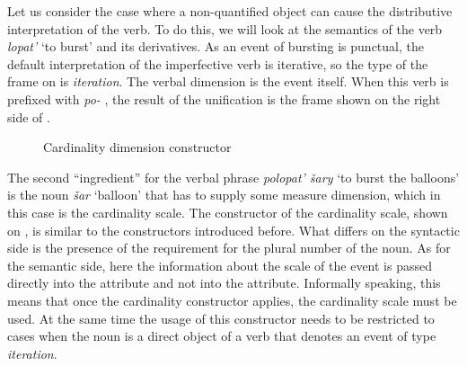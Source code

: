 Let us consider the case where a non-quantified object can cause the distributive  interpretation of the verb. To do this, we will look at the semantics of the verb \textit{lopat'} `to burst' and its derivatives. As an event of bursting is punctual, the default interpretation of the imperfective verb  is iterative, so the type of the frame on  is \textit{iteration}. The verbal dimension is the event itself. When this verb is prefixed with \textit{po-}  , the result of the unification is the frame shown on the right side of .

\begin{figure}
\small
{}
\hspace{1em}\normalsize%
\caption{Cardinality dimension constructor\label{constructor:cardinality}}
\end{figure}

The second ``ingredient'' for the verbal phrase \textit{polopat' \v{s}ary} `to burst the balloons' is the noun \textit{\v{s}ar} `balloon' that has to supply some measure dimension, which in this case is the cardinality scale. The constructor of the cardinality scale, shown on , is similar to the constructors introduced before. What differs on the syntactic side is the presence of the requirement for the plural number of the noun. As for the semantic side, here the information about the scale of the event is passed directly into the \MDIM attribute and not into the \NOUNDIM attribute. Informally speaking, this means that once the cardinality constructor applies, the cardinality scale must be used. At the same time the usage of this constructor needs to be restricted to cases when the noun is a direct object of a verb that denotes an event of type \textit{iteration}. 

